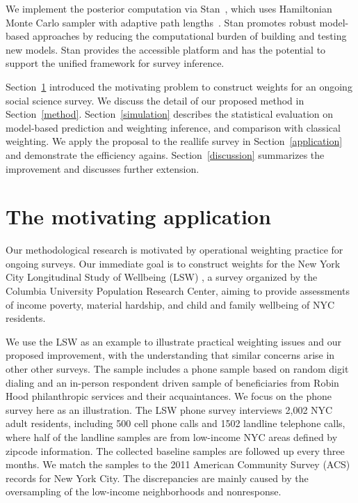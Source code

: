 \documentclass[11pt]{article}
\begin{document}
We implement the posterior computation via Stan~\citep{stan-software:2013,stan-manual:2013}, which uses Hamiltonian Monte Carlo sampler with adaptive path lengths~\citep{hoffman-gelman:2012}.  Stan promotes robust model-based approaches by reducing the computational burden of building and testing new models. Stan provides the accessible platform and has the potential to support the unified framework for survey inference.

Section~\ref{problem} introduced the motivating problem to construct weights for an ongoing social science survey. We discuss the detail of our proposed method in Section~\ref{method}. Section~\ref{simulation} describes the statistical evaluation on model-based prediction and weighting inference, and comparison with classical weighting. We apply the proposal to the reallife survey in Section~\ref{application} and demonstrate the efficiency agains. Section~\ref{discussion} summarizes the improvement and discusses further extension.

\section{The motivating application}
\label{problem}
	
Our methodological research is motivated by operational weighting practice for ongoing surveys. Our immediate goal is to construct weights for the New York City Longitudinal Study of Wellbeing  (LSW) \citep{RHweighting,RHreport}, a survey organized by the Columbia University Population Research Center, aiming to provide assessments of income poverty, material hardship, and child and family wellbeing of NYC residents.

We use the LSW as an example to illustrate practical weighting issues and our proposed improvement, with the understanding that similar concerns arise in other other surveys. The sample includes a phone sample based on random digit dialing and an in-person respondent driven sample of beneficiaries from Robin Hood philanthropic services and their acquaintances. We focus on the phone survey here as an illustration. The LSW phone survey interviews 2,002 NYC adult residents, including 500 cell phone calls and 1502 landline telephone calls, where half of the landline samples are from low-income NYC areas defined by zipcode information. The collected baseline samples are followed up every three months. We match the samples to the 2011 American Community Survey (ACS) records for New York City. The discrepancies are mainly caused by the oversampling of the low-income neighborhoods and nonresponse. 
\end{document}
